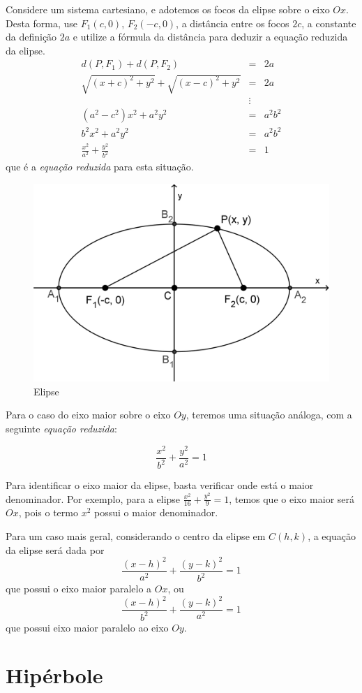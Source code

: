 Considere um sistema cartesiano, e adotemos os focos da elipse sobre o eixo $Ox$. Desta forma, use $F_1(c, 0)$, $F_2(-c,0)$, a distância entre os focos $2c$, a constante da definição $2a$ e utilize a fórmula da distância para deduzir a equação reduzida da elipse.
\begin{eqnarray*}
d(P, F_1)+d(P, F_2)&=&2a \\
\sqrt{(x+c)^2+y^2} + \sqrt{(x-c)^2+y^2}& = & 2a  \\
&\vdots &\\
(a^2-c^2)x^2+a^2y^2&=&a^2b^2 \\
b^2x^2+a^2y^2&=&a^2b^2 \\
\frac{x^2}{a^2}+\frac{y^2}{b^2}& =& 1
\end{eqnarray*}
que é a \textit{equação reduzida} para esta situação.

\begin{figure}[H]
\centering
\includegraphics[width=0.45\linewidth]{analitica/imagens/elipseh1.png}
\caption{Elipse }
\label{fig:elipseh1}
\end{figure}

Para o caso do eixo maior sobre o eixo $Oy$, teremos uma situação análoga, com a seguinte \textit{equação reduzida}:

$$\frac{x^2}{b^2}+\frac{y^2}{a^2}=1$$

Para identificar o eixo maior da elipse, basta verificar onde está o maior denominador. Por exemplo, para a elipse $\displaystyle \frac{x^2}{16}+\frac{y^2}{9}=1$, temos que o eixo maior será $Ox$, pois o termo $x^2$ possui o maior denominador.

Para um caso mais geral, considerando o centro da elipse em $C(h, k)$, a equação da elipse será dada por $$\frac{\left(x-h\right)^2}{a^2}+\frac{\left(y-k\right)^2}{b^2}=1$$ que possui o eixo maior paralelo a $Ox$, ou $$\frac{\left(x-h\right)^2}{b^2}+\frac{\left(y-k\right)^2}{a^2}=1$$ que possui eixo maior paralelo ao eixo $Oy$.

\section{Hipérbole}


